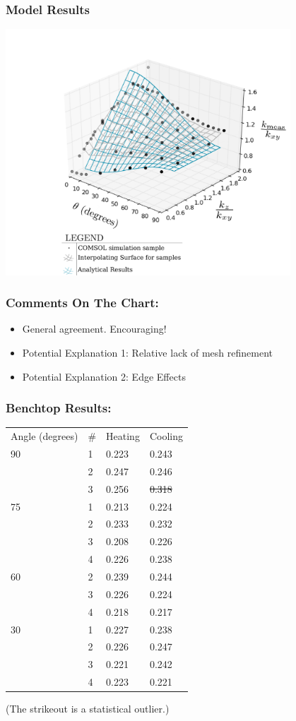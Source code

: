 \documentclass{beamer}
\begin{document}
\begin{frame}
\frametitle{Model Results}
\includegraphics[width=0.8\textwidth]{fig/numvanal.png}
\end{frame}


\begin{frame}
\frametitle{Comments On The Chart:}
\begin{itemize}
\item General agreement. Encouraging!
\item Potential Explanation 1: Relative lack of mesh refinement
\item Potential Explanation 2: Edge Effects
\end{itemize}
\end{frame}


\begin{frame}
\frametitle{Benchtop Results:}
\begin{table}
\begin{tabular}{l l | l l}
Angle (degrees) & \# & Heating & Cooling\\
90 & 1 & 0.223 & 0.243\\
& 2 & 0.247 & 0.246\\
& 3 & 0.256 & \sout{0.318}\\
75 & 1 & 0.213 & 0.224\\
& 2 & 0.233 & 0.232\\
& 3 & 0.208 & 0.226\\
& 4 & 0.226 & 0.238\\
60 & 2 & 0.239 & 0.244\\
& 3 & 0.226 & 0.224\\
& 4 & 0.218 & 0.217\\
30 & 1 & 0.227 & 0.238\\
& 2 & 0.226 & 0.247\\
& 3 & 0.221 & 0.242\\
& 4 & 0.223 & 0.221\\
\end{tabular}
\end{table}
(The strikeout is a statistical outlier.)
\end{frame}
\end{document}
